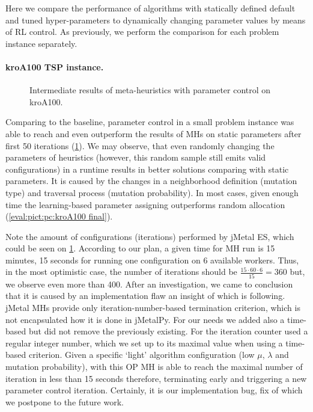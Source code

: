 Here we compare the performance of algorithms with statically defined default and tuned hyper-parameters to dynamically changing parameter values by means of RL control. As previously, we perform the comparison for each problem instance separately.

\newpage
\paragraph{kroA100 TSP instance.}
\begin{figure}[t]
	\centering
	
	\caption{Intermediate results of meta-heuristics with parameter control on kroA100.}
	\label{eval:pict:pc:kroA100 intermediate}
\end{figure}

Comparing to the baseline, parameter control in a small problem instance was able to reach and even outperform the results of MHs on static parameters after first 50 iterations (\cref{eval:pict:pc:kroA100 intermediate}). We may observe, that even randomly changing the parameters of heuristics (however, this random sample still emits valid configurations) in a runtime results in better solutions comparing with static parameters. It is caused by the changes in a neighborhood definition (mutation type) and traversal process (mutation probability). In most cases, given enough time the learning-based parameter assigning outperforms random allocation (\cref{eval:pict:pc:kroA100 final}).

Note the amount of configurations (iterations) performed by jMetal ES, which could be seen on \cref{eval:pict:pc:kroA100 intermediate}. According to our plan, a given time for MH run is 15 minutes, 15 seconds for running one configuration on 6 available workers. Thus, in the most optimistic case, the number of iterations should be $ \frac{15\cdot60\cdot6}{15} = 360$ but, we observe even more than 400. After an investigation, we came to conclusion that it is caused by an implementation flaw an insight of which is following. jMetal MHs provide only iteration-number-based termination criterion, which is not encapsulated how it is done in jMetalPy. For our needs we added also a time-based but did not remove the previously existing. For the iteration counter used a regular integer number, which we set up to its maximal value when using a time-based criterion. Given a specific `light' algorithm configuration (low $\mu$, $\lambda$ and mutation probability), with this OP MH is able to reach the maximal number of iteration in less than 15 seconds therefore, terminating early and triggering a new parameter control iteration. Certainly, it is our implementation bug, fix of which we postpone to the future work.

